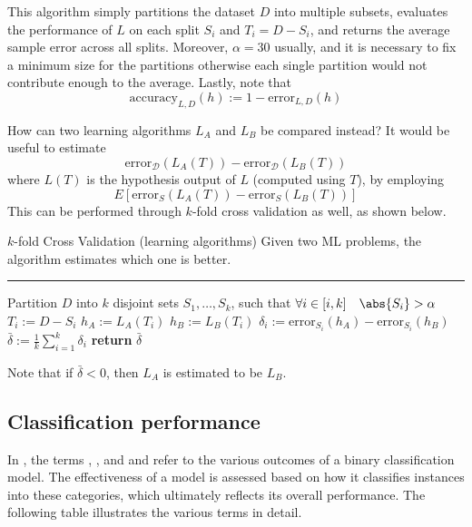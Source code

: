 \documentclass[a4paper, 12pt]{report}
\begin{document}
    This algorithm simply partitions the dataset $D$ into multiple subsets, evaluates the performance of $L$ on each split $S_i$ and $T_i = D - S_i$, and returns the average sample error across all splits. Moreover, $\alpha = 30$ usually, and it is necessary to fix a minimum size for the partitions otherwise each single partition would not contribute enough to the average. Lastly, note that $$\mathrm{accuracy}_{L, D}(h) := 1 - \mathrm{error}_{L, D}(h)$$

    How can two learning algorithms $L_A$ and $L_B$ be compared instead? It would be useful to estimate $$\mathrm{error}_\mathcal D (L_A(T)) - \mathrm{error}_\mathcal D(L_B(T))$$ where $L(T)$ is the hypothesis output of $L$ (computed using $T$), by employing $$E[\mathrm{error}_S(L_A(T)) - \mathrm{error}_S(L_B(T))]$$ This can be performed through $k$-fold cross validation as well, as shown below.

    \begin{framedalgo}{$k$-fold Cross Validation (learning algorithms)}
        Given two ML problems, the algorithm estimates which one is better. \\
        \hrule
        \quad
        \label{alg:k-fold2}
        \begin{algorithmic}[1]
                \State Partition $D$ into $k$ disjoint sets $S_1, \ldots , S_k$, such that $\forall i \in [i, k] \quad \abs{S_i} > \alpha$
                    \State $T_i := D - S_i$ 
                    \State $h_A := L_A(T_i)$
                    \State $h_B := L_B(T_i)$
                    \State $\delta_i := \mathrm{error}_{S_i}(h_A) - \mathrm{error}_{S_i}(h_B)$
                \EndFor
                \State $\bar \delta := \frac{1}{k} \sum_{i = 1}^k{\delta_i}$
                \State \textbf{return} $\bar \delta$
            \EndFunction
        \end{algorithmic}
    \end{framedalgo}

    Note that if $\bar \delta < 0$, then $L_A$ is estimated to be  $L_B$.

    \subsection{Classification performance}

    In , the terms , , and  and  refer to the various outcomes of a binary classification model. The effectiveness of a model is assessed based on how  it classifies instances into these categories, which ultimately reflects its overall performance. The following table illustrates the various terms in detail.
\end{document}
